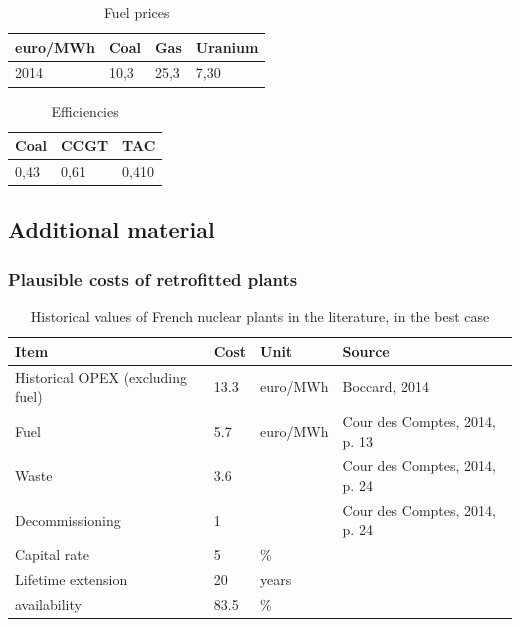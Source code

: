 \begin{table}[!ht]
	\centering
	\caption{Fuel prices}
	\label{tab:Fuel_prices}
	\begin{tabular}{llll}
		\toprule
		euro/MWh & Coal & Gas & Uranium \\
		\midrule
		2014 & 10,3 & 25,3 & 7,30 \\
		\bottomrule
	\end{tabular}
\end{table}

\begin{table}
	\centering
	\caption{Efficiencies}
	\label{tab:Efficiencies}
	\begin{tabular}{lll}
		\toprule
		Coal & CCGT & TAC \\
		\midrule
		0,43 & 0,61 & 0,410 \\
		\bottomrule
	\end{tabular}
\end{table}

\clearpage
\subsection{Additional material}

\subsubsection{Plausible costs of retrofitted plants}

\begin{table}[!htp]
	\centering
	\caption{Historical values of French nuclear plants in the literature, in the best case}
	\label{tab:historical_costs}
	\begin{tabular}{llll}
		\toprule
		Item & Cost & Unit & Source \\
		\midrule
		Historical OPEX (excluding fuel) & 13.3 & euro/MWh & Boccard, 2014 \\
		Fuel & 5.7 & euro/MWh & Cour des Comptes, 2014, p. 13 \\
		Waste & 3.6 &  & Cour des Comptes, 2014, p. 24 \\
		Decommissioning & 1 &  & Cour des Comptes, 2014, p. 24 \\
		Capital rate & 5 & \% &  \\
		Lifetime extension & 20 & years & \\
		availability & 83.5 & \% & \\
		\bottomrule
	\end{tabular}
\end{table}


